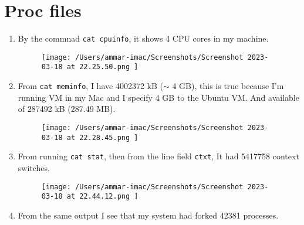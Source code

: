 \documentclass{article}
\def\c#1{\texttt{#1}}
\begin{document}
\section{Proc files}%
\begin{enumerate}
	\item By the commnad \c{cat cpuinfo}, it shows 4 CPU cores in my machine.
	      \begin{figure}[ht]
		      \centering
		      \texttt{[image: /Users/ammar-imac/Screenshots/Screenshot 2023-03-18 at 22.25.50.png ]}
	      \end{figure}
        \newpage
	\item From \c{cat meminfo}, I have 4002372 kB ($\sim$ 4 GB), this is true because I'm running VM in my Mac and I
        specify 4 GB to the Ubuntu VM. And available of 287492 kB (287.49 MB).
	      \begin{figure}[ht]
		      \centering
		      \texttt{[image: /Users/ammar-imac/Screenshots/Screenshot 2023-03-18 at 22.28.45.png ]}
	      \end{figure}
   \item From running \c{cat stat}, then from the line field \c{ctxt}, It had 5417758 context switches.
	      \begin{figure}[ht]
		      \centering
		      \texttt{[image: /Users/ammar-imac/Screenshots/Screenshot 2023-03-18 at 22.44.12.png ]}
	      \end{figure}
   \item From the same output I see that my system had forked 42381 processes.
\end{enumerate}


\newpage
\end{document}
